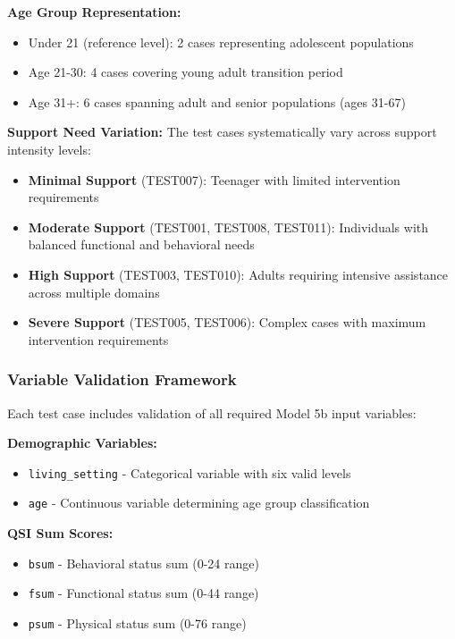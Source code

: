 \textbf{Age Group Representation:}
\begin{itemize}
    \item Under 21 (reference level): 2 cases representing adolescent populations
    \item Age 21-30: 4 cases covering young adult transition period
    \item Age 31+: 6 cases spanning adult and senior populations (ages 31-67)
\end{itemize}

\textbf{Support Need Variation:}
The test cases systematically vary across support intensity levels:
\begin{itemize}
    \item \textbf{Minimal Support} (TEST007): Teenager with limited intervention requirements
    \item \textbf{Moderate Support} (TEST001, TEST008, TEST011): Individuals with balanced functional and behavioral needs
    \item \textbf{High Support} (TEST003, TEST010): Adults requiring intensive assistance across multiple domains
    \item \textbf{Severe Support} (TEST005, TEST006): Complex cases with maximum intervention requirements
\end{itemize}

\subsubsection{Variable Validation Framework}

Each test case includes validation of all required Model 5b input variables:

\textbf{Demographic Variables:}
\begin{itemize}
    \item \texttt{living\_setting} - Categorical variable with six valid levels
    \item \texttt{age} - Continuous variable determining age group classification
\end{itemize}

\textbf{QSI Sum Scores:}
\begin{itemize}
    \item \texttt{bsum} - Behavioral status sum (0-24 range)
    \item \texttt{fsum} - Functional status sum (0-44 range) 
    \item \texttt{psum} - Physical status sum (0-76 range)
\end{itemize}

